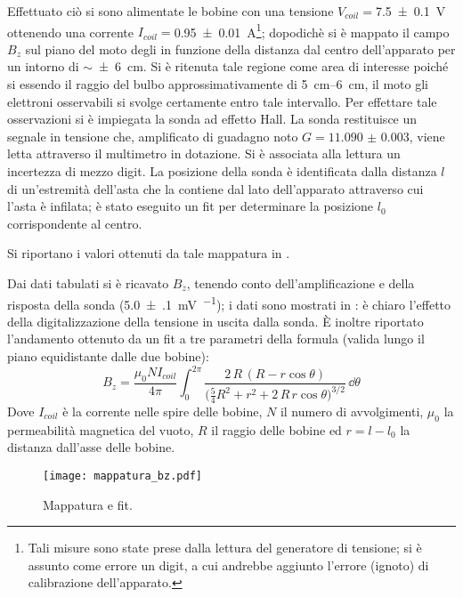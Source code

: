 		Effettuato ciò si sono alimentate le bobine con una tensione
		$V_{coil}=$\SI{7.5 \pm 0.1}{\volt} ottenendo una corrente
		$I_{coil}=$\SI{0.95 \pm 0.01}{\ampere}\footnote{Tali misure sono state prese
		dalla lettura del generatore di tensione;
		si è assunto come errore un digit, a cui andrebbe
		aggiunto l'errore (ignoto) di calibrazione dell'apparato.};
		dopodichè si è mappato il campo $B_z$ sul
		piano del moto degli \e in funzione della distanza dal centro dell'apparato
		per un intorno di $\sim $\SI{\pm 6}{\cm}.
		Si è ritenuta tale regione come area di interesse poiché si essendo il
		raggio del bulbo approssimativamente di \SIrange{5}{6}{\cm},
		il moto gli elettroni osservabili si svolge certamente entro tale intervallo.
		Per effettare tale osservazioni si è impiegata la sonda ad effetto Hall.
		La sonda restituisce un segnale in tensione che, amplificato
		di guadagno noto $G = \num{11.090(3)}$, viene letta attraverso il multimetro
		in dotazione. Si è associata alla lettura un incertezza di mezzo digit.
		La posizione della sonda è identificata dalla distanza $l$ di un'estremità dell'asta
		che la contiene dal lato dell'apparato attraverso cui l'asta è infilata;
		è stato eseguito un fit per determinare la posizione $l_0$ corrispondente al centro.

		Si riportano i valori ottenuti da tale mappatura in .

	Dai dati tabulati si è ricavato $B_z$, tenendo conto dell'amplificazione e della risposta della sonda
	(\SI{5.0(1)}{\mV\per\gauss}); i dati sono mostrati in : è chiaro l'effetto della digitalizzazione
	della tensione in uscita dalla sonda. È inoltre riportato l'andamento ottenuto
	da un fit a tre parametri della formula (valida lungo il piano equidistante dalle due bobine):
	\begin{equation} \label{eq:bz}
		B_z = \frac{\mu_0 N I_{coil}}{4 \pi} \int_0^{2\pi} \frac{2\, R\, (R - r \cos\theta )}{\big(\frac{5}{4} R^2 + r^2 + 2\, R \, r \cos \theta\big) ^ {3/2}} \, \dd \theta
	\end{equation}
	Dove $I_{coil}$ è la corrente nelle spire delle bobine, $N$ il numero di avvolgimenti,
	$\mu_0$ la permeabilità magnetica del vuoto, $R$ il raggio delle bobine
	ed $r = l - l_0$ la distanza dall'asse delle bobine.

	\begin{figure}[h]
		\centering
		\texttt{[image: mappatura\_bz.pdf]}
		\caption{Mappatura e fit.}
		\label{fig:fit1}
	\end{figure}

